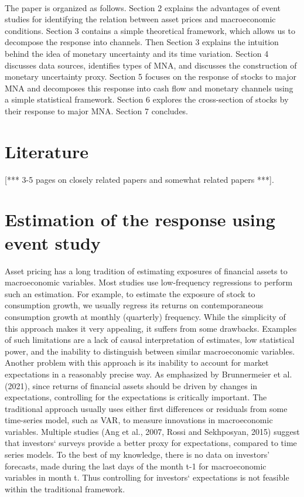 \documentclass[12pt]{article}
\begin{document}
\paragraph{}
The paper is organized as follows. Section 2 explains the advantages of event studies for identifying the relation between asset prices and macroeconomic conditions. Section 3 contains a simple theoretical framework, which allows us to decompose the response into channels. Then Section 3 explains the intuition behind the idea of monetary uncertainty and its time variation. Section 4 discusses data sources, identifies types of MNA, and discusses the construction of monetary uncertainty proxy. Section 5 focuses on the response of stocks to major MNA and decomposes this response into cash flow and monetary channels using a simple statistical framework. Section 6 explores the cross-section of stocks by their response to major MNA. Section 7 concludes.

\section{Literature} 

[*** 3-5 pages on closely related papers and somewhat related papers ***].


\section{Estimation of the response using event study}

Asset pricing has a long tradition of estimating exposures of financial assets to macroeconomic variables. Most studies use low-frequency regressions to perform such an estimation. For example, to estimate the exposure of stock to consumption growth, we usually regress its returns on contemporaneous consumption growth at monthly (quarterly) frequency. While the simplicity of this approach makes it very appealing, it suffers from some drawbacks. Examples of such limitations are a lack of causal interpretation of estimates, low statistical power, and the inability to distinguish between similar macroeconomic variables. Another problem with this approach is its inability to account for market expectations in a reasonably precise way. As emphasized by Brunnermeier et al. (2021), since returns of financial assets should be driven by changes in expectations, controlling for the expectations is critically important. The traditional approach usually uses either first differences or residuals from some time-series model, such as VAR, to measure innovations in macroeconomic variables. Multiple studies (Ang et al., 2007, Rossi and Sekhposyan, 2015) suggest that investors` surveys provide a better proxy for expectations, compared to time series models. To the best of my knowledge, there is no data on investors' forecasts, made during the last days of the month t-1 for macroeconomic variables in month t. Thus controlling for investors` expectations is not feasible within the traditional framework.
\end{document}
